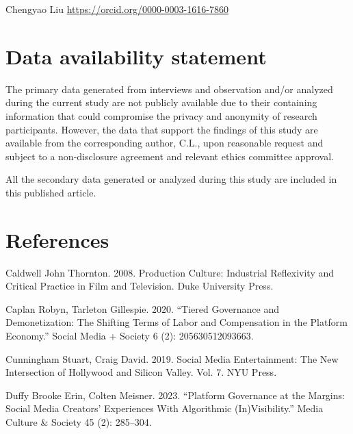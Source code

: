 \documentclass[10pt,a4paper]{article}
\begin{document}
Chengyao Liu \url{https://orcid.org/0000-0003-1616-7860}\par
\section*{Data availability statement}
The primary data generated from interviews and observation and/or analyzed during the current study are not publicly available due to their containing information that could compromise the privacy and anonymity of research participants. However, the data that support the findings of this study are available from the corresponding author, C.L., upon reasonable request and subject to a non-disclosure agreement and relevant ethics committee approval.\par
All the secondary data generated or analyzed during this study are included in this published article.\par
\section*{References}
\noindent\begin{minipage}{\linewidth}Caldwell John Thornton. 2008. Production Culture: Industrial Reflexivity and Critical Practice in Film and Television. Duke University Press.\par\end{minipage}\par
\noindent\begin{minipage}{\linewidth}Caplan Robyn, Tarleton Gillespie. 2020. “Tiered Governance and Demonetization: The Shifting Terms of Labor and Compensation in the Platform Economy.” Social Media + Society 6 (2): 205630512093663.\par\end{minipage}\par
\noindent\begin{minipage}{\linewidth}Cunningham Stuart, Craig David. 2019. Social Media Entertainment: The New Intersection of Hollywood and Silicon Valley. Vol. 7. NYU Press.\par\end{minipage}\par
\noindent\begin{minipage}{\linewidth}Duffy Brooke Erin, Colten Meisner. 2023. “Platform Governance at the Margins: Social Media Creators’ Experiences With Algorithmic (In)Visibility.” Media Culture \& Society 45 (2): 285–304.\par\end{minipage}\par
\end{document}
